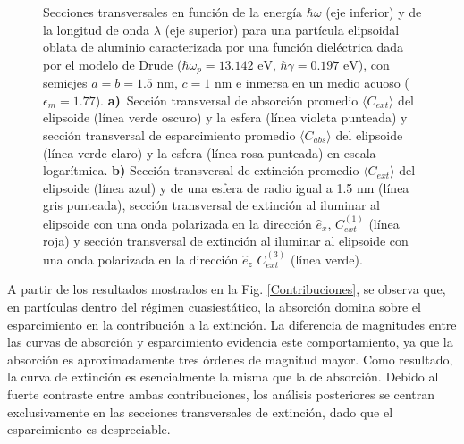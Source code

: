 \begin{figure}[h!]
	\quad%
	\caption{Secciones transversales en función de la energía $\hbar\omega$ (eje inferior) y de la longitud de onda $\lambda$ (eje superior) para una partícula elipsoidal oblata de aluminio caracterizada por una función dieléctrica dada por el modelo de Drude ($\hbar\omega_p=13.142\text{ eV}$, $\hbar\gamma=0.197\text{ eV}$), con semiejes $a=b=1.5\text{ nm}$, $c=1\text{ nm}$ e inmersa en un medio acuoso ($\epsilon_m=1.77$). \textbf{a)}~Sección transversal de absorción promedio $\langle C_{ext}\rangle$  del elipsoide (línea verde oscuro) y la esfera (línea violeta punteada) y sección transversal de esparcimiento promedio $\langle C_{abs}\rangle$  del elipsoide (línea verde claro) y la esfera (línea rosa punteada) en escala logarítmica. \textbf{b)} Sección transversal de extinción promedio $\langle C_{ext}\rangle$ del elipsoide (línea azul) y de una esfera de radio igual a 1.5 nm (línea gris punteada), sección transversal de extinción al iluminar al elipsoide con una onda polarizada en la dirección $\hat{e}_x$, $C_{ext}^{(1)}$  (línea roja)  y sección transversal de extinción al iluminar al elipsoide con una onda polarizada en la dirección $\hat{e}_z$ $C_{ext}^{(3)}$  (línea verde).} \label{fig:test}
\end{figure}

A partir de los resultados mostrados en la Fig. \ref{Contribuciones}, se observa que, en partículas dentro del régimen cuasiestático, la absorción domina sobre el esparcimiento en la contribución a la extinción.  La diferencia de magnitudes entre las curvas de absorción y esparcimiento evidencia este comportamiento, ya que la absorción es aproximadamente tres órdenes de magnitud mayor. Como resultado, la curva de extinción es esencialmente la misma que la de absorción. Debido al fuerte contraste entre ambas contribuciones, los análisis posteriores se centran exclusivamente en las secciones transversales de extinción, dado que el esparcimiento es despreciable.\\

